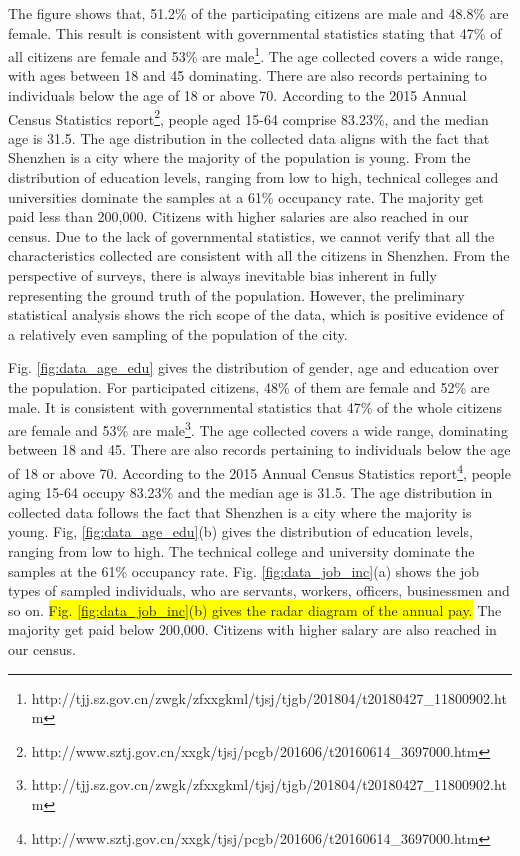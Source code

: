 \documentclass{ieeeaccess}
\begin{document}
The figure shows that, 51.2\% of the participating citizens are male and 48.8\% are female. This result is consistent with governmental statistics stating that 47\% of all citizens are female and 53\% are male\footnote{http://tjj.sz.gov.cn/zwgk/zfxxgkml/tjsj/tjgb/201804/t20180427\_11800902.htm}. The age collected covers a wide range, with ages between 18 and 45 dominating. There are also records pertaining to individuals below the age of 18 or above 70. According to the 2015 Annual Census Statistics report\footnote{http://www.sztj.gov.cn/xxgk/tjsj/pcgb/201606/t20160614\_3697000.htm}, people aged 15-64 comprise 83.23\%, and the median age is 31.5. The age distribution in the collected data aligns with the fact that Shenzhen is a city where the majority of the population is young. From the distribution of education levels, ranging from low to high, technical colleges and universities dominate the samples at a 61\% occupancy rate. The majority get paid less than 200,000. Citizens with higher salaries are also reached in our census. Due to the lack of governmental statistics, we cannot verify that all the characteristics collected are consistent with all the citizens in Shenzhen. From the perspective of surveys, there is always inevitable bias inherent in fully representing the ground truth of the population. However, the preliminary statistical analysis shows the rich scope of the data, which is positive evidence of a relatively even sampling of the population of the city.


\iffalse
Fig. \ref{fig:data_age_edu} gives the distribution of gender, age and education over the population. For participated citizens, 48\% of them are female and 52\% are male. It is consistent with governmental statistics that 47\% of the whole citizens are female and 53\% are male\footnote{http://tjj.sz.gov.cn/zwgk/zfxxgkml/tjsj/tjgb/201804/t20180427\_11800902.htm}. The age collected covers a wide range, dominating between 18 and 45. There are also records pertaining to individuals below the age of 18 or above 70. According to the 2015 Annual Census Statistics report\footnote{http://www.sztj.gov.cn/xxgk/tjsj/pcgb/201606/t20160614\_3697000.htm}, people aging 15-64 occupy 83.23\% and the median age is 31.5. The age distribution in collected data follows the fact that Shenzhen is a city where the majority is young. Fig, \ref{fig:data_age_edu}(b) gives the distribution of education levels, ranging from low to high. The technical college and university dominate the samples at the 61\% occupancy rate. Fig. \ref{fig:data_job_inc}(a) shows the job types of sampled individuals, who are servants, workers, officers, businessmen and so on. \colorbox{yellow}{Fig. \ref{fig:data_job_inc}(b) gives the radar diagram of the annual pay.} The majority get paid below 200,000. Citizens with higher salary are also reached in our census.
\end{document}
